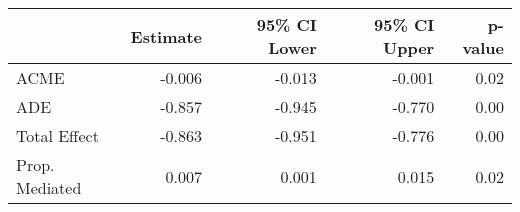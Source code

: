 
\begin{tabular}[t]{lrrrr}
\toprule
  & Estimate & 95\% CI Lower & 95\% CI Upper & p-value\\
\midrule
ACME & -0.006 & -0.013 & -0.001 & 0.02\\
ADE & -0.857 & -0.945 & -0.770 & 0.00\\
Total Effect & -0.863 & -0.951 & -0.776 & 0.00\\
Prop. Mediated & 0.007 & 0.001 & 0.015 & 0.02\\
\bottomrule
\end{tabular}

